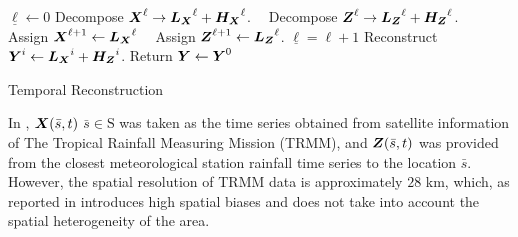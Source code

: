 {\vspace*{0.1in}
\begin{algorithm}[t]
\begin{algorithmic}[1]
    \STATE $\underline{\ell}\gets 0$
	\STATE  Decompose $\text{\boldmath$X$}^{\ell } \rightarrow  \text{\boldmath$L_X$}^{\ell } + \text{\boldmath$H_X$}^{\ell }$.
	\STATEx $\;\,\,$ Decompose ${\text{\boldmath$Z$}}^{\ell } \rightarrow \text{\boldmath$L_Z$}^{\ell } + \text{\boldmath$H_Z$}^{\ell }$.
	\STATEx $\;\,\,$ Assign ${\text{\boldmath$X$}}^{\ell +1} \gets \text{\boldmath$L_X$}^{\ell } $
	\STATEx $\;\,\,$ Assign ${\text{\boldmath$Z$}}^{\ell +1} \gets \text{\boldmath$L_Z$}^{\ell } $.
	\STATE $\underline{\ell}=\ell +1$ 
	\ELSE
	\ENDIF
\ENDFOR
%
	\STATE Reconstruct $\text{\boldmath$Y$}^{i} \gets \text{\boldmath$L_X$}^{i} + \text{\boldmath$H_Z$}^{i}$.
\ENDFOR
 \STATE Return $\text{\boldmath$Y$} \gets \text{\boldmath$Y$}^0$ 
\end{algorithmic}
		\caption{Temporal Reconstruction}
\end{algorithm}
\vspace*{0.1in}


In \citep{Heidinger-et-al_2012}, $\text{\boldmath$X$}(\bar{s},t)$   $\bar{s}\in \mbox{S}$ was taken as the time series obtained from satellite information of The Tropical Rainfall Measuring Mission (TRMM), and $\text{\boldmath$Z$}(\bar{s},t)$  was provided from the closest meteorological station rainfall time series to the location $\bar{s}$. However, the spatial resolution of TRMM data is approximately $28$ km, which, as reported in \citep{Heidinger-et-al_2012} introduces high spatial biases and does not take into account the spatial heterogeneity of the area.  

}
